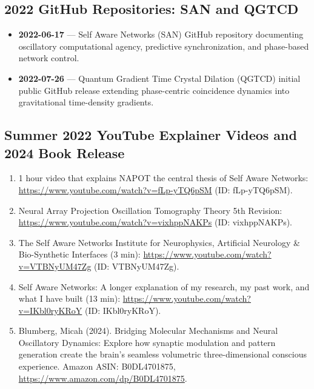 \documentclass[american,11pt,letterpaper]{article}
\def\texttt#1{#1}%
\def\emph#1{#1}%
\begin{document}
\subsection{2022 GitHub Repositories: SAN and QGTCD}
\begin{itemize}
  \item \textbf{2022-06-17} --- \emph{Self Aware Networks} (SAN) GitHub repository documenting oscillatory computational agency, predictive synchronization, and phase-based network control.
  \item \textbf{2022-07-26} --- \emph{Quantum Gradient Time Crystal Dilation (QGTCD)} initial public GitHub release extending phase-centric coincidence dynamics into gravitational time-density gradients.
\end{itemize}

\subsection{Summer 2022 YouTube Explainer Videos and 2024 Book Release}
\begin{enumerate}[leftmargin=2em]
  \item \emph{1 hour video that explains NAPOT the central thesis of Self Aware Networks}: \url{https://www.youtube.com/watch?v=fLp-yTQ6pSM} (ID: \texttt{fLp-yTQ6pSM}).
  \item \emph{Neural Array Projection Oscillation Tomography Theory 5th Revision}: \url{https://www.youtube.com/watch?v=vixhppNAKPs} (ID: \texttt{vixhppNAKPs}).
  \item \emph{The Self Aware Networks Institute for Neurophysics, Artificial Neurology \& Bio-Synthetic Interfaces} (3 min): \url{https://www.youtube.com/watch?v=VTBNyUM47Zg} (ID: \texttt{VTBNyUM47Zg}).
  \item \emph{Self Aware Networks: A longer explanation of my research, my past work, and what I have built} (13 min): \url{https://www.youtube.com/watch?v=IKbl0ryKRoY} (ID: \texttt{IKbl0ryKRoY}).
  \item Blumberg, Micah (2024). \emph{Bridging Molecular Mechanisms and Neural Oscillatory Dynamics: Explore how synaptic modulation and pattern generation create the brain's seamless volumetric three-dimensional conscious experience}. Amazon ASIN: \texttt{B0DL4701875}, \url{https://www.amazon.com/dp/B0DL4701875}.
\end{enumerate}
\end{document}
